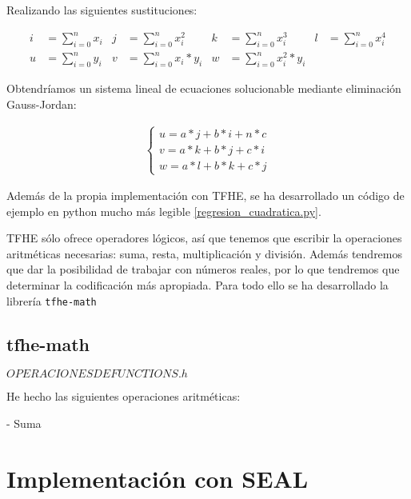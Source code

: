 Realizando las siguientes sustituciones:

\begin{align*}
    i &= \sum_{i=0}^n x_i & j &= \sum_{i=0}^n x_i^2 & k &= \sum_{i=0}^n x_i^3 & l &= \sum_{i=0}^n x_i^4 \\
    u &= \sum_{i=0}^n y_i & v &= \sum_{i=0}^n x_i * y_i & w &= \sum_{i=0}^n x_i^2 * y_i
\end{align*}

Obtendríamos un sistema lineal de ecuaciones solucionable mediante eliminación Gauss-Jordan:

\begin{gather*}
    \begin{cases}
        u = a*j + b*i + n*c \\
        v = a*k + b*j + c*i \\
        w = a*l + b*k + c*j
    \end{cases}
\end{gather*}

Además de la propia implementación con TFHE, se ha desarrollado un código de ejemplo en python mucho más legible \ref{regresion_cuadratica.py}.

TFHE sólo ofrece operadores lógicos, así que tenemos que escribir la operaciones aritméticas necesarias: suma, resta, multiplicación y división. Además tendremos que dar la posibilidad de trabajar con números reales, por lo que tendremos que determinar la codificación más apropiada. Para todo ello se ha desarrollado la librería \texttt{tfhe-math}

\subsection{tfhe-math}

$ OPERACIONES DE FUNCTIONS.h $

He hecho las siguientes operaciones aritméticas:

- Suma


\section{Implementación con SEAL}
